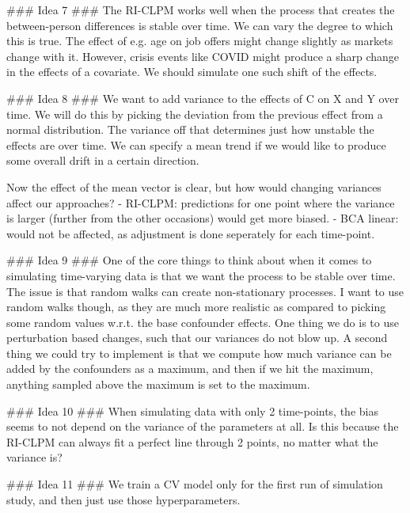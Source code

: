 ### Idea 7 ### 
The RI-CLPM works well when the process that creates the between-person differences is stable over time. We can vary the degree to which this is 
true. The effect of e.g. age on job offers might change slightly as markets change with it. However, crisis events like COVID might produce a sharp
change in the effects of a covariate. We should simulate one such shift of the effects. 

### Idea 8 ###
We want to add variance to the effects of C on X and Y over time. We will do this by picking the deviation from the previous effect
from a normal distribution. The variance off that determines just how unstable the effects are over time. We can specify a mean trend 
if we would like to produce some overall drift in a certain direction. 

Now the effect of the mean vector is clear, but how would changing variances affect our approaches?
- RI-CLPM: predictions for one point where the variance is larger (further from the other occasions) would get more biased. 
- BCA linear: would not be affected, as adjustment is done seperately for each time-point. 

### Idea 9 ###    
One of the core things to think about when it comes to simulating time-varying data is that we want the process to be stable over time.
The issue is that random walks can create non-stationary processes. I want to use random walks though, as they are much more realistic as
compared to picking some random values w.r.t. the base confounder effects. One thing we do is to use perturbation based changes, such 
that our variances do not blow up. A second thing we could try to implement is that we compute how much variance can be added by the confounders
as a maximum, and then if we hit the maximum, anything sampled above the maximum is set to the maximum.

### Idea 10 ### 
When simulating data with only 2 time-points, the bias seems to not depend on the variance of the parameters at all. Is this because the 
RI-CLPM can always fit a perfect line through 2 points, no matter what the variance is?

### Idea 11 ###   
We train a CV model only for the first run of simulation study, and then just use those hyperparameters. 